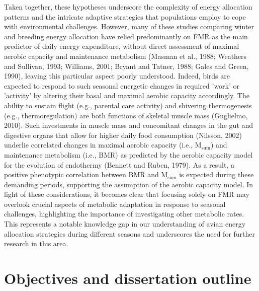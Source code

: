 \documentclass[10pt, twoside]{book} %
\begin{document}
Taken together, these hypotheses underscore the complexity of energy allocation patterns and the intricate adaptive strategies that populations employ to cope with environmental challenges. However, many of these studies comparing winter and breeding energy allocation have relied predominantly on FMR as the main predictor of daily energy expenditure, without direct assessment of maximal aerobic capacity and maintenance metabolism (Masman et al., 1988; Weathers and Sullivan, 1993; Williams, 2001; Bryant and Tatner, 1988; Gales and Green, 1990), leaving this particular aspect poorly understood. Indeed, birds are expected to respond to such seasonal energetic changes in required 'work' or 'activity' by altering their basal and maximal aerobic capacity accordingly. The ability to sustain flight (e.g., parental care activity) and shivering thermogenesis (e.g., thermoregulation) are both functions of skeletal muscle mass (Guglielmo, 2010). Such investments in muscle mass and concomitant changes in the gut and digestive organs that allow for higher daily food consumption (Nilsson, 2002) underlie correlated changes in maximal aerobic capacity (i.e., M$_{\text{sum}}$) and maintenance metabolism (i.e., BMR) as predicted by the aerobic capacity model for the evolution of endothermy (Bennett and Ruben, 1979). As a result, a positive phenotypic correlation between BMR and M$_{\text{sum}}$ is expected during these demanding periods, supporting the assumption of the aerobic capacity model. In light of these considerations, it becomes clear that focusing solely on FMR may overlook crucial aspects of metabolic adaptation in response to seasonal challenges, highlighting the importance of investigating other metabolic rates. This represents a notable knowledge gap in our understanding of avian energy allocation strategies during different seasons and underscores the need for further research in this area. \\

\section{Objectives and dissertation outline}
\end{document}
